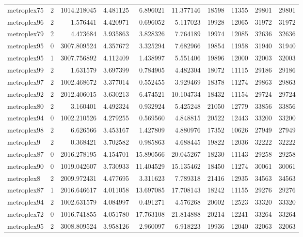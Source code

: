 \begin{longtable}{|l|r|r|r|r|r|r|r|r|r|}
metroplex75 & 2 & 1014.218045 & 4.481125 & 6.896021 & 11.377146 & 18598 & 11355 & 29801 & 29801 \\
metroplex96 & 2 & 1.576441 & 4.420971 & 0.696052 & 5.117023 & 19928 & 12065 & 31972 & 31972 \\
metroplex79 & 2 & 4.473684 & 3.935863 & 3.828326 & 7.764189 & 19974 & 12085 & 32636 & 32636 \\
metroplex95 & 0 & 3007.809524 & 4.357672 & 3.325294 & 7.682966 & 19854 & 11958 & 31940 & 31940 \\
metroplex95 & 1 & 3007.756892 & 4.112409 & 1.438997 & 5.551406 & 19896 & 12000 & 32003 & 32003 \\
metroplex99 & 2 & 1.631579 & 3.697399 & 0.784905 & 4.482304 & 18072 & 11115 & 29186 & 29186 \\
metroplex97 & 2 & 1002.468672 & 3.377014 & 0.552455 & 3.929469 & 18378 & 11274 & 29863 & 29863 \\
metroplex92 & 2 & 2012.406015 & 3.630213 & 6.474521 & 10.104734 & 18432 & 11154 & 29724 & 29724 \\
metroplex80 & 2 & 3.160401 & 4.492324 & 0.932924 & 5.425248 & 21050 & 12779 & 33856 & 33856 \\
metroplex94 & 0 & 1002.210526 & 4.279255 & 0.569560 & 4.848815 & 20522 & 12443 & 33200 & 33200 \\
metroplex98 & 2 & 6.626566 & 3.453167 & 1.427809 & 4.880976 & 17352 & 10626 & 27949 & 27949 \\
metroplex9 & 2 & 0.368421 & 3.702582 & 0.985863 & 4.688445 & 19822 & 12036 & 32222 & 32222 \\
metroplex87 & 0 & 2016.278195 & 4.154701 & 15.890566 & 20.045267 & 18230 & 11143 & 29258 & 29258 \\
metroplex90 & 0 & 1019.042607 & 3.730933 & 11.404529 & 15.135462 & 18450 & 11274 & 30061 & 30061 \\
metroplex8 & 2 & 2009.972431 & 4.477695 & 3.311623 & 7.789318 & 21416 & 12935 & 34563 & 34563 \\
metroplex87 & 1 & 2016.646617 & 4.011058 & 13.697085 & 17.708143 & 18242 & 11155 & 29276 & 29276 \\
metroplex94 & 2 & 1002.631579 & 4.084997 & 0.491271 & 4.576268 & 20602 & 12523 & 33320 & 33320 \\
metroplex72 & 0 & 1016.741855 & 4.051780 & 17.763108 & 21.814888 & 20214 & 12241 & 33264 & 33264 \\
metroplex95 & 2 & 3008.809524 & 3.958126 & 2.960097 & 6.918223 & 19936 & 12040 & 32063 & 32063 \\

\end{longtable}
